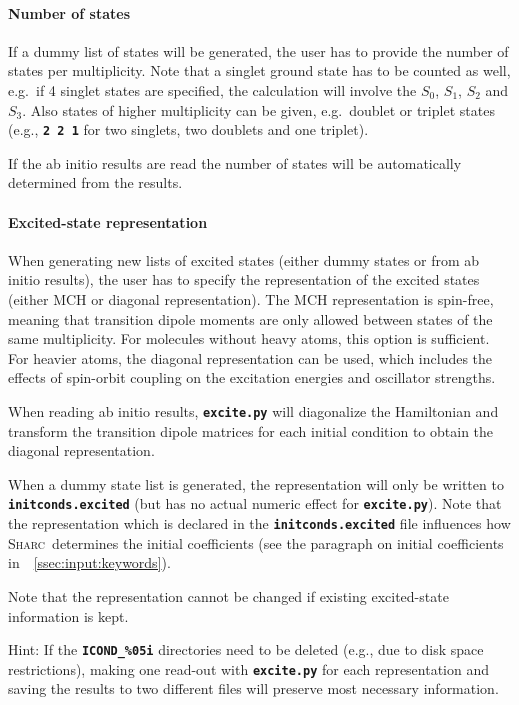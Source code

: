 \documentclass[a4paper,10pt,DIV=15,openany,twoside=false]{scrbook}
\newcommand{\sharc}{\textsc{Sharc}}
\newcommand{\ttt}[1]{\textbf{\texttt{#1}}}
\begin{document}
\paragraph{Number of states}

If a dummy list of states will be generated, the user has to provide the number of states per multiplicity. Note that a singlet ground state has to be counted as well, e.g.\ if 4 singlet states are specified, the calculation will involve the $S_0$, $S_1$, $S_2$ and $S_3$. Also states of higher multiplicity can be given, e.g.\ doublet or triplet states (e.g., \ttt{2 2 1} for two singlets, two doublets and one triplet).

If the ab initio results are read the number of states will be automatically determined from the results.

\paragraph{Excited-state representation}

When generating new lists of excited states (either dummy states or from ab initio results), the user has to specify the representation of the excited states (either MCH or diagonal representation). The MCH representation is spin-free, meaning that transition dipole moments are only allowed between states of the same multiplicity. For molecules without heavy atoms, this option is sufficient. For heavier atoms, the diagonal representation can be used, which includes the effects of spin-orbit coupling on the excitation energies and oscillator strengths. 

When reading ab initio results, \ttt{excite.py} will diagonalize the Hamiltonian and transform the transition dipole matrices for each initial condition to obtain the diagonal representation. 

When a dummy state list is generated, the representation will only be written to \ttt{initconds.excited} (but has no actual numeric effect for \ttt{excite.py}). Note that the representation which is declared in the \ttt{initconds.excited} file influences how \sharc\ determines the initial coefficients (see the paragraph on initial coefficients in~~\ref{ssec:input:keywords}).

Note that the representation cannot be changed if existing excited-state information is kept. 

Hint: If the \ttt{ICOND\_\%05i} directories need to be deleted (e.g., due to disk space restrictions), making one read-out with \ttt{excite.py} for each representation and saving the results to two different files will preserve most necessary information.
\end{document}
